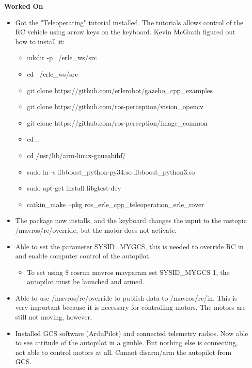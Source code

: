 \documentclass[compsoc,draftclsnofoot,onecolumn,10pt]{IEEEtran}
\begin{document}
\textbf{Worked On}
\begin{itemize}
    \item Got the "Teleoperating" tutorial installed. The tutorials allows control of the RC vehicle using arrow keys on the keyboard. Kevin McGrath figured out how to install it:
    \begin{itemize}
        \item mkdir -p ~/erle\_ws/src
        \item cd ~/erle\_ws/src
        \item git clone https://github.com/erlerobot/gazebo\_cpp\_examples
        \item git clone https://github.com/ros-perception/vision\_opencv
        \item git clone https://github.com/ros-perception/image\_common
        \item cd ..
        \item cd /usr/lib/arm-linux-gnueabihf/
        \item sudo ln -s libboost\_python-py34.so libboost\_python3.so
        \item sudo apt-get install libgtest-dev
        \item catkin\_make --pkg ros\_erle\_cpp\_teleoperation\_erle\_rover
    \end{itemize}

    \item The package now installs, and the keyboard changes the input to the rostopic /mavros/rc/override, but the motor does not activate.

    \item Able to set the parameter SYSID\_MYGCS, this is needed to override RC in and enable computer control of the autopilot.
    \begin{itemize}
        \item To set using \$ rosrun mavros mavparam set SYSID\_MYGCS 1, the autopilot must be launched and armed.
    \end{itemize}
    \item Able to use /mavros/rc/override to publish data to /mavros/rc/in. This is very important because it is necessary for controlling motors. The motors are still not moving, however.

    \item Installed GCS software (ArduPilot) and connected telemetry radios. Now able to see attitude of the autopilot in a gimble. But nothing else is connecting, not able to control motors at all. Cannot disarm/arm the autopilot from GCS.
\end{itemize}
\end{document}
